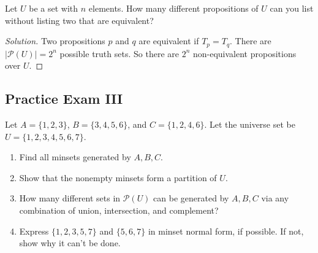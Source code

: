 \documentclass[../main.tex]{subfiles}
\begin{document}
\begin{problem}
Let $U$ be a set with $n$ elements. How many different propositions of $U$ can you list without listing two that are equivalent?
\end{problem}
\begin{proof}[Solution]
Two propositions $p$ and $q$ are equivalent if $T_p = T_q$. There are $|\mathcal{P}(U)| = 2^n$ possible truth sets. So there are $2^n$ non-equivalent propositions over $U$.
\end{proof}
%
\subsection{Practice Exam III}
%
\begin{problem}
Let $A= \{1,2,3\}$, $B = \{3,4,5,6\}$, and $C = \{1,2,4,6\}$. Let the universe set be $U = \{1,2,3,4,5,6,7\}$. 
\begin{enumerate}
\item Find all minsets generated by $A,B,C$.
\item Show that the nonempty minsets form a partition of $U$.
\item How many different sets in $\mathcal{P}(U)$ can be generated by $A,B,C$ via any combination of union, intersection, and complement?
\item Express $\{1,2,3,5,7\}$ and $\{5,6,7\}$ in minset normal form, if possible. If not, show why it can't be done.
\end{enumerate}
\end{problem}
\end{document}
